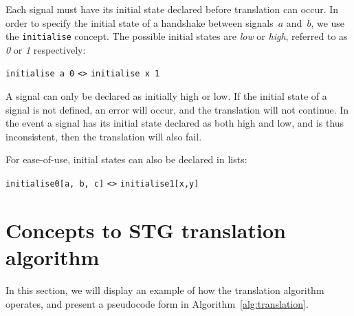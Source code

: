 \documentclass[british,conference,compsoc]{IEEEtran}
\begin{document}
Each signal must have its initial state declared before translation can occur. 
In order to specify the initial state of a handshake between signals~$a$
and~$b$, we use the \texttt{initialise} concept.
The possible initial states are \emph{low} or \emph{high}, referred to as 
\emph{0} or \emph{1} respectively:

\vspace{-1mm}

\begin{center}
   \texttt{initialise a 0} \texttt{<>} \texttt{initialise x 1}
\end{center}

\vspace{-1mm}

\noindent A signal can only be declared as initially high or low. If the 
initial state of a signal is not defined, an error will occur, and the 
translation will not continue. In the event a signal has its 
initial state declared as both high and low, and is thus inconsistent, then the translation will also fail.

For ease-of-use, initial states can also be declared in lists:

\begin{center}
\texttt{initialise0[a, b, c]} \texttt{<>} \texttt{initialise1[x,y]}
\end{center}

\vspace{-2mm}

\section{Concepts to STG translation algorithm\label{sec:algorithm}}

\vspace{-2mm}

In this section, we will display an example of how the translation algorithm 
operates, and present a pseudocode form in Algorithm~\ref{alg:translation}. 

\vspace{-2mm}
\end{document}
